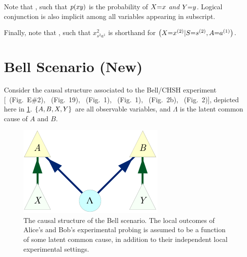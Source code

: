Note that , such that $\p{x y}$ is the probability of $X\cramp{=}x$ \emph{and} $Y\cramp{=}y$. Logical conjunction is also implicit among all variables appearing in subscript.

Finally, note that , such that $x^2_{s^2 a^1}$ is shorthand for $\parens*{X\cramp{=}x^{(2)}|S\cramp{=}s^{(2)},A\cramp{=}a^{(1)}}$. 



\section{Bell Scenario (New)}

Consider the causal structure associated to the Bell/CHSH \cite{bell1964einstein,Brunner2013Bell,bell1966lhvm,CHSHOriginal} experiment [\citealp{pusey2014gdag}~(Fig.~E\#2), \citealp{WoodSpekkens}~(Fig.~19), \citealp{chaves2014novel}~(Fig.~1), \citealp{BeyondBellII}~(Fig.~1), \citealp{wolfe2015nonconvexity}~(Fig.~2b), \citealp{steeg2011relaxation}~(Fig.~2)], depicted here in \cref{fig:NewBellDAG}. $\brackets{A,B,X,Y}$ are all observable variables, and $\Lambda$ is the latent common cause of $A$ and $B$.

\begin{figure}[H]
\centering
\includegraphics[scale=1]{NewBellDAG.pdf}
\caption{The causal structure of the Bell scenario. The local outcomes of Alice's and Bob's experimental probing is assumed to be a function of some latent common cause, in addition to their independent local experimental settings.}\label{fig:NewBellDAG}
\end{figure}


